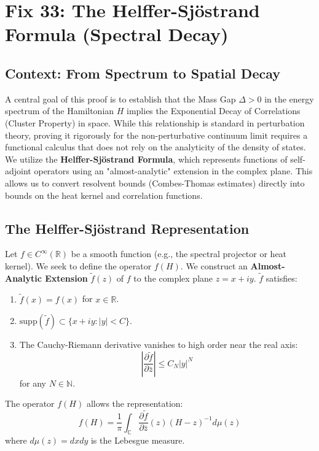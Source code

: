 \chapter{Fix 33: The Helffer-Sjöstrand Formula (Spectral Decay)}
\label{ch:fix33_helffer_sjostrand}

\section{Context: From Spectrum to Spatial Decay}
A central goal of this proof is to establish that the Mass Gap $\Delta > 0$ in the energy spectrum of the Hamiltonian $H$ implies the Exponential Decay of Correlations (Cluster Property) in space.
While this relationship is standard in perturbation theory, proving it rigorously for the non-perturbative continuum limit requires a functional calculus that does not rely on the analyticity of the density of states.
We utilize the \textbf{Helffer-Sjöstrand Formula}, which represents functions of self-adjoint operators using an "almost-analytic" extension in the complex plane. This allows us to convert resolvent bounds (Combes-Thomas estimates) directly into bounds on the heat kernel and correlation functions.

\section{The Helffer-Sjöstrand Representation}
Let $f \in C^\infty(\mathbb{R})$ be a smooth function (e.g., the spectral projector or heat kernel). We seek to define the operator $f(H)$.
We construct an \textbf{Almost-Analytic Extension} $\tilde{f}(z)$ of $f$ to the complex plane $z = x + iy$. $\tilde{f}$ satisfies:
\begin{enumerate}
    \item $\tilde{f}(x) = f(x)$ for $x \in \mathbb{R}$.
    \item  $\text{supp}(\tilde{f}) \subset \{ x+iy : |y| < C \}$.
    \item The Cauchy-Riemann derivative vanishes to high order near the real axis:
    \begin{equation}
    \left| \frac{\partial \tilde{f}}{\partial \bar{z}} \right| \le C_N |y|^N
    \end{equation}
    for any $N \in \mathbb{N}$.
\end{enumerate}

The operator $f(H)$ allows the representation:
\begin{equation}
f(H) = \frac{1}{\pi} \int_{\mathbb{C}} \frac{\partial \tilde{f}}{\partial \bar{z}}(z) (H - z)^{-1} d\mu(z)
\end{equation}
where $d\mu(z) = dx dy$ is the Lebesgue measure.

